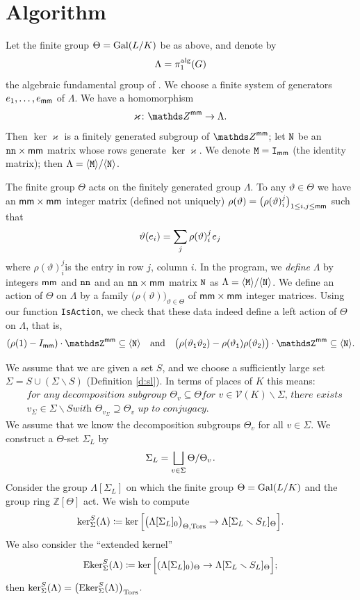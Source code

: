 \documentclass[11pt]{amsart}
\renewcommand{\mathbb}{\mathds}
\theoremstyle{plain}
\theoremstyle{definition}
\newcommand{\Z}{{\mathbb Z}}
\newcommand{\Gal}{{\rm Gal}}
\newcommand{\hs}{\kern 0.8pt}
\newcommand{\alg}{{\rm alg}}
\newcommand{\V}{{\mathcal V}}
\newcommand{\Tors}{{\rm Tors}}
\newcommand{\Tht}{{\Theta,\Tors}}
\newcommand{\ThT}{\Tht}
\newcommand{\vt}{{\vartheta}}
\newcommand{\la}{\langle}
\newcommand{\ra}{\rangle}
\newcommand{\smm}{{\sf mm}}
\begin{document}
\newcommand{\vk}{{\varkappa}}


\section{Algorithm}
\label{s:algorithm}


Let the finite group $\Theta=\Gal(L/K)$ be as above, and denote by
\[\Lambda=\pi_1^\alg(G)\]
the algebraic fundamental group of \cite{Borovoi-Memoir}.
We choose a finite system of generators  $e_1,\dots,e_\smm$ of $\Lambda$.
We have a homomorphism
\begin{equation*}
\vk\colon \Z^{\smm}\to\Lambda.
\end{equation*}
Then $\ker\vk$ is a  finitely generated subgroup of $\Z^{\smm}$;
let $\tt N$ be an $\tt nn\times\smm$ matrix whose rows generate $\ker\vk$.
We denote  $\tt M=I_\smm$ (the identity matrix); then $\Lambda=\tt \la M\ra/\la N\ra$.

The finite group $\Theta$ acts on the finitely generated group $\Lambda$.
To any $\vt\in\Theta$ we have an $\smm\times\smm$ integer matrix (defined not uniquely)
$\rho(\vt)=\big(\rho(\vt)_i^j\big)_{1\le i,j\le\smm}$ such that
\[\vt(e_i)=\sum_j\rho(\vt)_i^j\hs e_j\hs\]
where $\rho(\vt)_i^j$is the entry in row $j$, column $i$.
In the program, we {\em define} $\Lambda$ by  integers $\smm$ and $\tt nn$
and an $\tt nn\times\smm$  matrix $\tt N$ as $\Lambda=\tt\la M\ra/\la N\ra$.
We define an action of $\Theta$ on $\Lambda$ by a family $\big(\rho(\vt)\big)_{\vt\in\Theta}$
of $\smm\times\smm$ integer matrices.
Using our function {\tt IsAction}, we check that these data
indeed define a left action of $\Theta$ on $\Lambda$, that is,
\[(\rho(1)-I_\smm)\cdot\tt \Z^\smm\subseteq\la N\ra\quad\text{and}
\quad \big(\rho(\vt_1\vt_2)-\rho(\vt_1)\rho(\vt_2)\big)\cdot \tt \Z^\smm\subseteq\la N\ra.\]

We assume that we are given a set $S$, and we choose a sufficiently large set $\Sigma=S\cup (\Sigma\smallsetminus S)$ (Definition \ref{d:sl}).
In terms of places of $K$ this means:
\begin{equation}
\begin{aligned}\label{e:v-Sigma}
&\textit{for any decomposition subgroup $\Theta_v\subseteq \Theta$
for $v\in \V(K)\smallsetminus \Sigma$, there exists} \\
&\textit{$v_\Sigma\in \Sigma\smallsetminus S$
with $\Theta_{v_\Sigma}\supseteq \Theta_v$ up to conjugacy.}
\end{aligned}
\end{equation}
We assume that we know the decomposition subgroups $\Theta_v$ for all $v\in \Sigma$.
We construct a $\Theta$-set $\Sigma_L$ by
\[ \Sigma_L=\bigsqcup_{v\in\Sigma} \Theta/\Theta_v\hs.\]
Consider the group $\Lambda[\Sigma_L]$ on which the  finite group $\Theta=\Gal(L/K)$ and the group ring
$\Z[\Theta]$ act.
We wish to compute
\[ \ker_\Sigma^S(\Lambda)\coloneqq
\ker\Big[ \big(\Lambda[\Sigma_L]_0\big)_\ThT\to \Lambda[\Sigma_L\smallsetminus S_L]_\Theta\Big].\]
We also consider the ``extended kernel''
\[ {\rm Eker}_\Sigma^S(\Lambda)\coloneqq
\ker\Big[ (\Lambda[\Sigma_L]_0)_\Theta\to \Lambda[\Sigma_L\smallsetminus S_L]_\Theta\Big];\]
then $\ker_\Sigma^S(\Lambda)=\big({\rm Eker}_\Sigma^S(\Lambda)\big)_{\rm Tors}\hs.$
\end{document}
